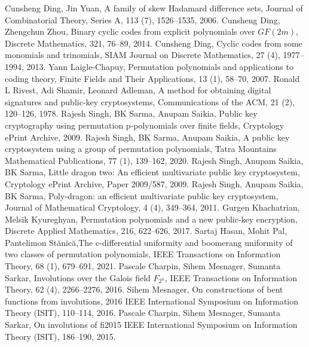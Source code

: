 \documentclass[12pt,a4paper]{article}
\begin{document}
\begin{thebibliography}{}
Cunsheng Ding,  Jin	Yuan, {{A family of skew Hadamard difference sets}}, Journal of Combinatorial Theory, Series A, 113 (7), 1526--1535, 2006.
Cunsheng Ding, Zhengchun   Zhou, {{Binary cyclic codes from explicit polynomials over $GF (2m)$}}, Discrete Mathematics, 321, 76--89, 2014.
Cunsheng Ding, 	{{Cyclic codes from some monomials and trinomials}}, SIAM Journal on Discrete Mathematics, 27 (4), 1977--1994, 2013.
 Yann Laigle-Chapuy, {{Permutation polynomials and applications to coding theory}}, Finite Fields and Their Applications, 13 (1), 58--70, 2007.
Ronald L Rivest,  Adi Shamir,  Leonard Adleman,  {{A method for obtaining digital signatures and public-key cryptosystems}}, Communications of the ACM, 21 (2), 120--126, 1978.
Rajesh Singh,   BK Sarma,  Anupam Saikia, 	{{Public key cryptography using permutation p-polynomials over finite fields}}, Cryptology ePrint Archive, 2009.
Rajesh Singh,   BK Sarma,  Anupam Saikia, 	{{A public key cryptosystem using a group of permutation polynomials}}, Tatra Mountains Mathematical Publications, 77 (1), 139--162, 2020.
Rajesh Singh,  Anupam Saikia, BK Sarma,   {{Little dragon two: An efficient multivariate public key cryptosystem}}, Cryptology ePrint Archive, Paper 2009/587,
2009.
	Rajesh Singh,  Anupam Saikia, BK Sarma,  {{Poly-dragon: an efficient multivariate public key cryptosystem}}, Journal of Mathematical Cryptology, 4 (4), 349--364, 2011.
Gurgen Khachatrian,  Melsik Kyureghyan, 	{{Permutation polynomials and a new public-key encryption}},
Discrete Applied Mathematics, 216, 622--626, 2017.
Sartaj Hasan,  Mohit Pal,   Pantelimon	 St{\u{a}}nic{\u{a}},{{The c-differential uniformity and boomerang uniformity of two classes of permutation polynomials}},
IEEE Transactions on Information Theory,
68 (1), 679--691, 2021.
Pascale Charpin, Sihem Mesnager,  Sumanta Sarkar, {{Involutions over the Galois field $ F_{2^{n}} $}}, IEEE Transactions on Information Theory,
62 (4), 2266--2276, 2016.
Sihem Mesnager,	{{On constructions of bent functions from involutions}},
2016 IEEE International Symposium on Information Theory (ISIT),
110--114, 2016.
Pascale Charpin, Sihem Mesnager,  Sumanta Sarkar, On involutions of fi2015 IEEE International Symposium on Information Theory (ISIT), 186--190, 2015.

\end{thebibliography}
\end{document}
